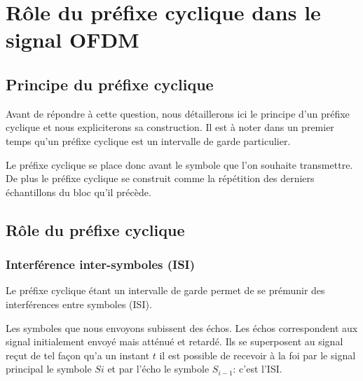 \chapter{Rôle du préfixe cyclique dans le signal OFDM}

\section{Principe du préfixe cyclique}

Avant de répondre à cette question, nous détaillerons ici le principe d'un
préfixe cyclique et nous expliciterons sa construction. Il est à noter dans un
premier temps qu'un préfixe cyclique est un intervalle de garde
particulier. ~\\


Le préfixe cyclique se place donc avant le symbole que l'on souhaite
transmettre. De plus le préfixe cyclique se construit comme la répétition des
derniers échantillons du bloc qu'il précède.



\section{Rôle du préfixe cyclique}

\subsection{Interférence inter-symboles (ISI)}
\label{ISI}



Le préfixe cyclique étant un intervalle de garde permet de se prémunir des
interférences entre symboles (ISI).

Les symboles que nous envoyons subissent des échos. Les échos correspondent aux
signal initialement envoyé mais atténué et retardé. Ils se superposent au signal
reçut de tel façon qu'a un instant $t$ il est possible de recevoir à la foi par le
signal principal le symbole $Si$ et par l'écho le symbole $S_{i-1}$: c'est l'ISI.

